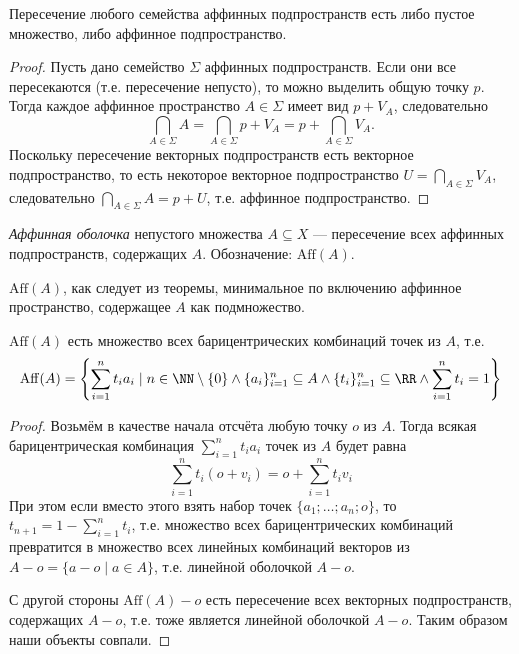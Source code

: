 \documentclass[12pt,a4paper]{article}
\newcommand{\Aff}{\ensuremath{\mathrm{Aff}}\xspace}
\begin{document}
    \begin{theorem}
        Пересечение любого семейства аффинных подпространств есть либо пустое множество, либо аффинное подпространство.
    \end{theorem}

    \begin{proof}
        Пусть дано семейство $\Sigma$ аффинных подпространств. Если они все пересекаются (т.е. пересечение непусто), то можно выделить общую точку $p$. Тогда каждое аффинное пространство $A \in \Sigma$ имеет вид $p + V_A$, следовательно
        \[\bigcap_{A \in \Sigma} A = \bigcap_{A \in \Sigma} p + V_A = p + \bigcap_{A \in \Sigma} V_A.\]
        Поскольку пересечение векторных подпространств есть векторное подпространство, то есть некоторое векторное подпространство $U = \bigcap_{A \in \Sigma} V_A$, следовательно $\bigcap_{A \in \Sigma} A = p + U$, т.е. аффинное подпространство.
    \end{proof}

    \begin{definition}
        \emph{Аффинная оболочка} непустого множества $A \subseteq X$ --- пересечение всех аффинных подпространств, содержащих $A$. Обозначение: $\Aff(A)$.
    \end{definition}

    \begin{remark}
        $\Aff(A)$, как следует из теоремы, минимальное по включению аффинное пространство, содержащее $A$ как подмножество.
    \end{remark}

    \begin{theorem}\label{affin-hull-lower-definition}
        $\Aff(A)$ есть множество всех барицентрических комбинаций точек из $A$, т.е.
        \[\Aff(A) = \left\{\sum_{i=1}^n t_i a_i \mid n \in \NN \setminus \{0\} \wedge \{a_i\}_{i=1}^n \subseteq A \wedge \{t_i\}_{i=1}^n \subseteq \RR \wedge \sum_{i=1}^n t_i = 1\right\}\]
    \end{theorem}

    \begin{proof}
        Возьмём в качестве начала отсчёта любую точку $o$ из $A$. Тогда всякая барицентрическая комбинация $\sum_{i=1}^n t_i a_i$ точек из $A$ будет равна
        \[\sum_{i=1}^n t_i (o + v_i) = o + \sum_{i=1}^n t_i v_i\]
        При этом если вместо этого взять набор точек $\{a_1; \dots; a_n; o\}$, то $t_{n+1} = 1 - \sum_{i=1}^n t_i$, т.е. множество всех барицентрических комбинаций превратится в множество всех линейных комбинаций векторов из $A - o = \{a - o \mid a \in A\}$, т.е. линейной оболочкой $A - o$.
        
        С другой стороны $\Aff(A) - o$ есть пересечение всех векторных подпространств, содержащих $A - o$, т.е. тоже является линейной оболочкой $A - o$. Таким образом наши объекты совпали.
    \end{proof}
\end{document}
